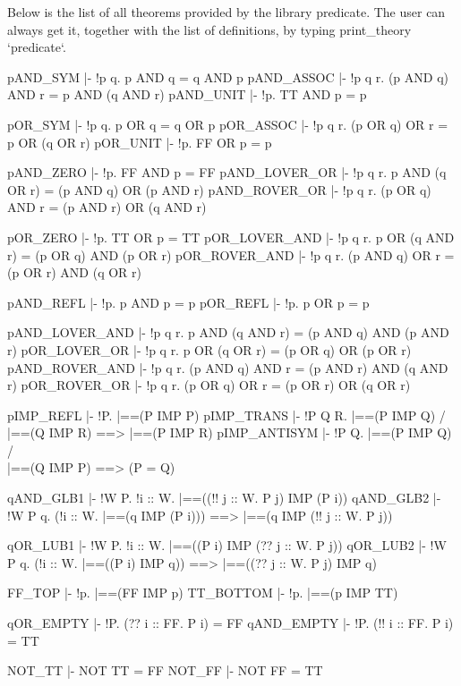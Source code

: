 Below is the list of all theorems provided by the library
\code{}predicate\edoc{}. The user can always get it, together with the list of
definitions, by typing \code{}print_theory `predicate`\edoc{}.

\enddocs
{}
\endmoddef

  pAND_SYM        |- !p q. p AND q = q AND p
  pAND_ASSOC      |- !p q r. (p AND q) AND r = p AND (q AND r)
  pAND_UNIT       |- !p. TT AND p = p

  pOR_SYM         |- !p q. p OR q = q OR p
  pOR_ASSOC       |- !p q r. (p OR q) OR r = p OR (q OR r)
  pOR_UNIT        |- !p. FF OR p = p

  pAND_ZERO       |- !p. FF AND p = FF
  pAND_LOVER_OR   |- !p q r. p AND (q OR r) = (p AND q) OR (p AND r)
  pAND_ROVER_OR   |- !p q r. (p OR q) AND r = (p AND r) OR (q AND r)

  pOR_ZERO        |- !p. TT OR p = TT
  pOR_LOVER_AND   |- !p q r. p OR (q AND r) = (p OR q) AND (p OR r)
  pOR_ROVER_AND   |- !p q r. (p AND q) OR r = (p OR r) AND (q OR r)

  pAND_REFL       |- !p. p AND p = p
  pOR_REFL        |- !p. p OR p = p

  pAND_LOVER_AND  |- !p q r. p AND (q AND r) = (p AND q) AND (p AND r)
  pOR_LOVER_OR    |- !p q r. p OR (q OR r) = (p OR q) OR (p OR r)
  pAND_ROVER_AND  |- !p q r. (p AND q) AND r = (p AND r) AND (q AND r)
  pOR_ROVER_OR    |- !p q r. (p OR q) OR r = (p OR r) OR (q OR r)

  pIMP_REFL       |- !P. |==(P IMP P)
  pIMP_TRANS      |- !P Q R. |==(P IMP Q) /\\ |==(Q IMP R) ==> |==(P IMP R)
  pIMP_ANTISYM    |- !P Q. |==(P IMP Q) /\\ |==(Q IMP P) ==> (P = Q)

  qAND_GLB1       |- !W P. !i :: W. |==((!! j :: W. P j) IMP (P i))
  qAND_GLB2       |- !W P q. (!i :: W. |==(q IMP (P i))) ==> 
                             |==(q IMP (!! j :: W. P j))

  qOR_LUB1        |- !W P. !i :: W. |==((P i) IMP (?? j :: W. P j))
  qOR_LUB2        |- !W P q. (!i :: W. |==((P i) IMP q)) ==> 
                             |==((?? j :: W. P j) IMP q)

  FF_TOP          |- !p. |==(FF IMP p)
  TT_BOTTOM       |- !p. |==(p IMP TT)

  qOR_EMPTY       |- !P. (?? i :: FF. P i) = FF
  qAND_EMPTY      |- !P. (!! i :: FF. P i) = TT

  NOT_TT          |- NOT TT = FF
  NOT_FF          |- NOT FF = TT

